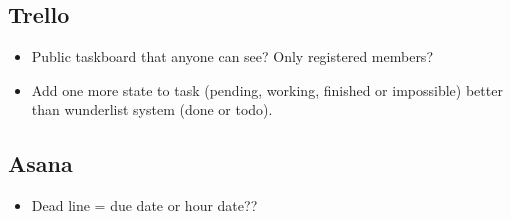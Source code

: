\subsection{Trello}

\begin{itemize}
\item Public taskboard that anyone can see? Only registered members?
\item Add one more state to task (pending, working, finished or impossible) better than wunderlist system (done or todo).
\end{itemize}

\subsection{Asana}
\begin{itemize}
 	\item  Dead line = due date or hour date??
\end{itemize}
